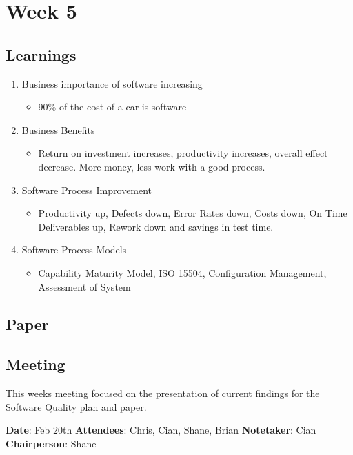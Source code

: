 \chapter{Week 5}

\section{Learnings}
\begin{enumerate}
\item Business importance of software increasing
\begin{itemize}
\item 90\% of the cost of a car is software
\end{itemize}
\item Business Benefits
\begin{itemize}
\item Return on investment increases, productivity increases, overall effect decrease. More money, less work with a good process.
\end{itemize}
\item Software Process Improvement
\begin{itemize}
\item Productivity up, Defects down, Error Rates down, Costs down, On Time Deliverables up, Rework down and savings in test time. 
\end{itemize}
\item Software Process Models
\begin{itemize}
\item Capability Maturity Model, ISO 15504, Configuration Management, Assessment of System
\end{itemize}
\end{enumerate}

\section{Paper}

\section{Meeting}

This weeks meeting focused on the presentation of current findings for the Software Quality plan and paper.

\textbf{Date}: Feb 20th\newline
\textbf{Attendees}: Chris, Cian, Shane, Brian\newline
\textbf{Notetaker}: Cian\newline
\textbf{Chairperson}: Shane\newline \newline

